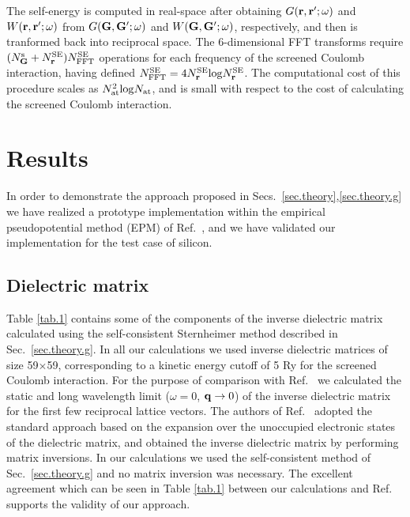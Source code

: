\documentclass[twocolumn,prb,showpacs,superscriptaddress]{revtex4}
\def\w{\omega}
\def\q{{\bf q}}
\def\G{{\bf G}}
\def\Gp{{\bf G^\prime}}
\def\r{{\bf r}}
\def\rp{{\bf r^\prime}}
\begin{document}
The self-energy is computed in real-space after obtaining $G(\r,\rp;\w)$ and $W(\r,\rp;\w)$ 
from $G(\G,\Gp;\w)$ and $W(\G,\Gp;\w)$, respectively, and then is tranformed back into reciprocal space.
The 6-dimensional FFT transforms require $(N_\G^{\rm s}+N_\r^{\rm SE})N^{\rm SE}_{\rm FFT}$
operations for each frequency of the screened Coulomb interaction,
having defined $N^{\rm SE}_{\rm FFT}=4 N_\r^{\rm SE} {\rm log} N_\r^{\rm SE}$.
The computational cost of this procedure scales as $N_{\rm at}^2 {\rm log} N_{\rm at}$,
and is small with respect to the cost of calculating the screened
Coulomb interaction.

\section{Results}\label{sec.results}

In order to demonstrate the approach proposed in Secs.~\ref{sec.theory},\ref{sec.theory.g}  we have realized a prototype implementation
within the empirical pseudopotential method (EPM) of Ref.\ ,
and we have validated our implementation for the test case of silicon.

\subsection{Dielectric matrix}\label{sec.5a}

Table \ref{tab.1} contains some of the components of the inverse dielectric matrix calculated using
the self-consistent Sternheimer method described in Sec.~\ref{sec.theory.g}.
In all our calculations we used inverse dielectric matrices of size 59$\times$59, 
corresponding to a kinetic energy cutoff of 5 Ry for the screened Coulomb interaction.
For the purpose of comparison with Ref.\  
we calculated the static and long wavelength limit ($\w=0$, $\q \rightarrow 0$) of the inverse dielectric matrix
for the first few reciprocal lattice vectors. 
The authors of Ref.\  adopted the standard approach based 
on the expansion over the unoccupied electronic states of the dielectric matrix, 
and obtained the inverse dielectric matrix by performing matrix inversions.
In our calculations we used the self-consistent method of Sec.~\ref{sec.theory.g}
and no matrix inversion was necessary.
The excellent agreement which can be seen in Table \ref{tab.1} between 
our calculations and Ref.~ supports the validity of our approach.
\end{document}
